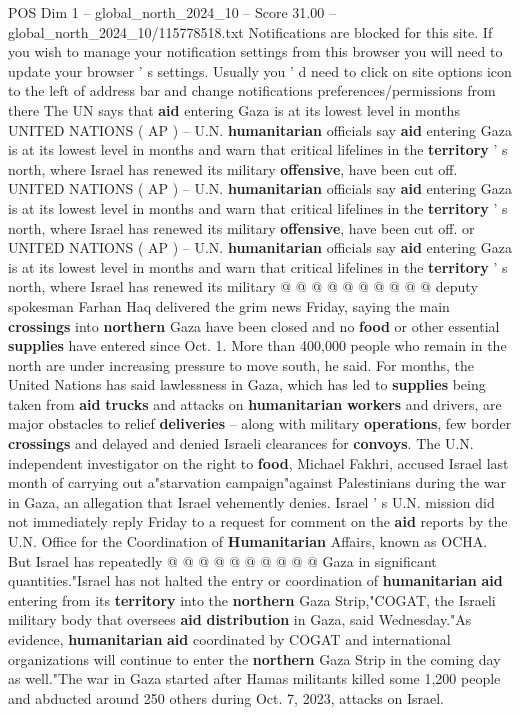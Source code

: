 \begin{textsample}{POS Dim 1 – global\_north\_2024\_10 – Score 31.00 – global\_north\_2024\_10/115778518.txt}  \label{ex:f1_pos_380}
Notifications are blocked for this site.
If you wish to manage your notification settings from this browser you will need to update your browser ' s settings.
Usually you ' d need to click on site options icon to the left of address bar and change notifications preferences/permissions from there The UN says that \textbf{aid} entering Gaza is at its lowest level in months UNITED NATIONS ( AP ) -- U.N. \textbf{humanitarian} officials say \textbf{aid} entering Gaza is at its lowest level in months and warn that critical lifelines in the \textbf{territory} ' s north, where Israel has renewed its military \textbf{offensive}, have been cut off.
UNITED NATIONS ( AP ) -- U.N. \textbf{humanitarian} officials say \textbf{aid} entering Gaza is at its lowest level in months and warn that critical lifelines in the \textbf{territory} ' s north, where Israel has renewed its military \textbf{offensive}, have been cut off. or UNITED NATIONS ( AP ) -- U.N. \textbf{humanitarian} officials say \textbf{aid} entering Gaza is at its lowest level in months and warn that critical lifelines in the \textbf{territory} ' s north, where Israel has renewed its military @ @ @ @ @ @ @ @ @ @ deputy spokesman Farhan Haq delivered the grim news Friday, saying the main \textbf{crossings} into \textbf{northern} Gaza have been closed and no \textbf{food} or other essential \textbf{supplies} have entered since Oct. 1.
More than 400,000 people who remain in the north are under increasing pressure to move south, he said.
For months, the United Nations has said lawlessness in Gaza, which has led to \textbf{supplies} being taken from \textbf{aid} \textbf{trucks} and attacks on \textbf{humanitarian} \textbf{workers} and drivers, are major obstacles to relief \textbf{deliveries} -- along with military \textbf{operations}, few border \textbf{crossings} and delayed and denied Israeli clearances for \textbf{convoys}.
The U.N. independent investigator on the right to \textbf{food}, Michael Fakhri, accused Israel last month of carrying out a"starvation campaign"against Palestinians during the war in Gaza, an allegation that Israel vehemently denies.
Israel ' s U.N. mission did not immediately reply Friday to a request for comment on the \textbf{aid} reports by the U.N.
Office for the Coordination of \textbf{Humanitarian} Affairs, known as OCHA.
But Israel has repeatedly @ @ @ @ @ @ @ @ @ @ Gaza in significant quantities."Israel has not halted the entry or coordination of \textbf{humanitarian} \textbf{aid} entering from its \textbf{territory} into the \textbf{northern} Gaza Strip,"COGAT, the Israeli military body that oversees \textbf{aid} \textbf{distribution} in Gaza, said Wednesday."As evidence, \textbf{humanitarian} \textbf{aid} coordinated by COGAT and international organizations will continue to enter the \textbf{northern} Gaza Strip in the coming day as well."The war in Gaza started after Hamas militants killed some 1,200 people and abducted around 250 others during Oct. 7, 2023, attacks on Israel.

\end{textsample}

